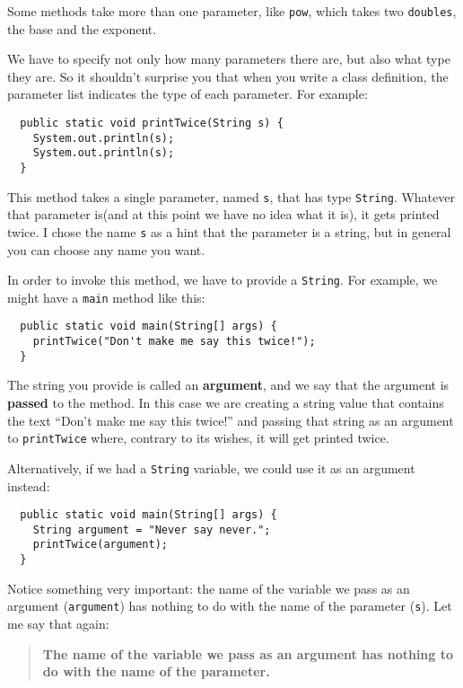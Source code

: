 \documentclass{book}
\begin{document}
Some methods take more than one parameter, like {\tt pow},
which takes two {\tt doubles}, the base and the exponent.

We have to specify not
only how many parameters there are, but also what type they
are.  So it shouldn't surprise you that when you write a
class definition, the parameter list indicates the type of
each parameter.  For example:

\begin{verbatim}
  public static void printTwice(String s) {
    System.out.println(s);
    System.out.println(s);
  }
\end{verbatim}
%
This method takes a single parameter, named {\tt s}, that
has type {\tt String}.  Whatever that parameter is(and at
this point we have no idea what it is), it gets printed
twice.  I chose the name {\tt s} as a hint that the parameter
is a string, but in general you can choose any name you want.

In order to invoke this method, we have to provide a {\tt String}.
For example, we might have a {\tt main} method like this:

\begin{verbatim}
  public static void main(String[] args) {
    printTwice("Don't make me say this twice!");
  }
\end{verbatim}

The string you provide is called an {\bf argument}, and we
say that the argument is {\bf passed} to the method.  In
this case we are creating a string value that contains the
text ``Don't make me say this twice!'' and passing that
string as an argument to {\tt printTwice} where, contrary
to its wishes, it will get printed twice.

Alternatively, if we had a {\tt String} variable, we could
use it as an argument instead:

\begin{verbatim}
  public static void main(String[] args) {
    String argument = "Never say never.";
    printTwice(argument);
  }
\end{verbatim}
%
Notice something very important: the name of the variable we pass
as an argument ({\tt argument}) has nothing to do with the name of the
parameter ({\tt s}).  Let me say that again:

\begin{quote}

{\bf The name of the variable we pass as an argument has nothing to do
with the name of the parameter.}

\end{quote}
\end{document}

